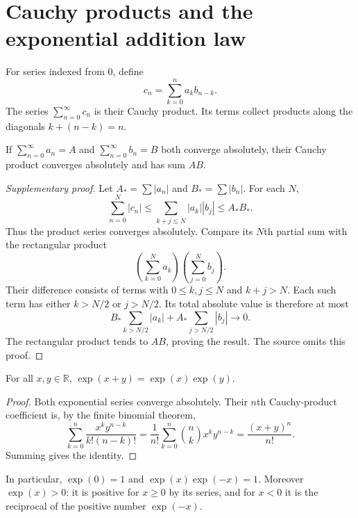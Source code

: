 \section{Cauchy products and the exponential addition law}
\begin{definition}
For series indexed from $0$, define
\[
c_n=\sum_{k=0}^n a_kb_{n-k}.
\]
The series $\sum_{n=0}^{\infty}c_n$ is their Cauchy product. Its terms
collect products along the diagonals $k+(n-k)=n$.
\end{definition}

\begin{theorem}
If $\sum_{n=0}^{\infty}a_n=A$ and $\sum_{n=0}^{\infty}b_n=B$ both
converge absolutely, their Cauchy product converges absolutely and has
sum $AB$.
\end{theorem}
\begin{proof}[Supplementary proof]
Let $A_* =\sum|a_n|$ and $B_* =\sum|b_n|$. For each $N$,
\[
\sum_{n=0}^N|c_n|
\leq\sum_{k+j\leq N}|a_k||b_j|\leq A_*B_*.
\]
Thus the product series converges absolutely.
Compare its $N$th partial sum with the rectangular product
\[
\left(\sum_{k=0}^N a_k\right)\left(\sum_{j=0}^N b_j\right).
\]
Their difference consists of terms
with $0\leq k,j\leq N$ and $k+j>N$. Each such term has either $k>N/2$
or $j>N/2$. Its total absolute value is therefore at most
\[
B_*\sum_{k>N/2}|a_k|+A_*\sum_{j>N/2}|b_j|\longrightarrow0.
\]
The rectangular product tends to $AB$, proving the result. The source
omits this proof.
\end{proof}

\begin{corollary}\label{thm:analysis-exp-addition}
For all $x,y\in\mathbb R$, $\exp(x+y)=\exp(x)\exp(y)$.
\end{corollary}
\begin{proof}
Both exponential series converge absolutely. Their $n$th Cauchy-product
coefficient is, by the finite binomial theorem,
\[
\sum_{k=0}^n\frac{x^ky^{n-k}}{k!(n-k)!}
=\frac1{n!}\sum_{k=0}^n\binom nk x^ky^{n-k}
=\frac{(x+y)^n}{n!}.
\]
Summing gives the identity.
\end{proof}
In particular, $\exp(0)=1$ and $\exp(x)\exp(-x)=1$.
Moreover $\exp(x)>0$: it is positive for $x\geq0$ by its series, and for
$x<0$ it is the reciprocal of the positive number $\exp(-x)$.
